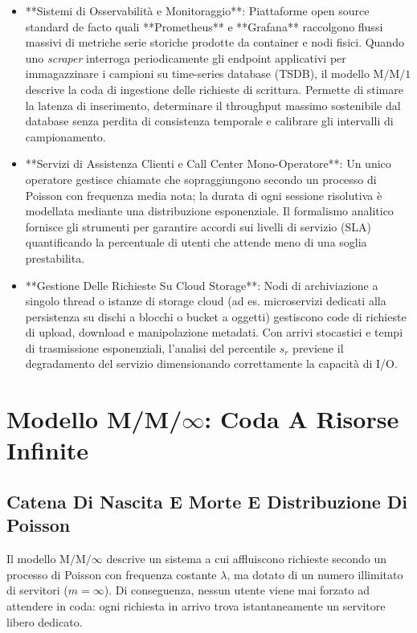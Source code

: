 \documentclass[11pt, a4paper]{article}
\begin{document}
\begin{itemize}
    \item **Sistemi di Osservabilità e Monitoraggio**: Piattaforme open source standard de facto quali **Prometheus** e **Grafana** raccolgono flussi massivi di metriche serie storiche prodotte da container e nodi fisici. Quando uno \emph{scraper} interroga periodicamente gli endpoint applicativi per immagazzinare i campioni su time-series database (TSDB), il modello $\mathrm{M/M/1}$ descrive la coda di ingestione delle richieste di scrittura. Permette di stimare la latenza di inserimento, determinare il throughput massimo sostenibile dal database senza perdita di consistenza temporale e calibrare gli intervalli di campionamento.
    \item **Servizi di Assistenza Clienti e Call Center Mono-Operatore**: Un unico operatore gestisce chiamate che sopraggiungono secondo un processo di Poisson con frequenza media nota; la durata di ogni sessione risolutiva è modellata mediante una distribuzione esponenziale. Il formalismo analitico fornisce gli strumenti per garantire accordi sui livelli di servizio (SLA) quantificando la percentuale di utenti che attende meno di una soglia prestabilita.
    \item **Gestione Delle Richieste Su Cloud Storage**: Nodi di archiviazione a singolo thread o istanze di storage cloud (ad es. microservizi dedicati alla persistenza su dischi a blocchi o bucket a oggetti) gestiscono code di richieste di upload, download e manipolazione metadati. Con arrivi stocastici e tempi di trasmissione esponenziali, l'analisi del percentile $s_r$ previene il degradamento del servizio dimensionando correttamente la capacità di I/O.
\end{itemize}

\newpage


\section{Modello M/M/$\infty$: Coda A Risorse Infinite}

\subsection{Catena Di Nascita E Morte E Distribuzione Di Poisson}

Il modello $\mathrm{M/M/\infty}$ descrive un sistema a cui affluiscono richieste secondo un processo di Poisson con frequenza costante $\lambda$, ma dotato di un numero illimitato di servitori ($m = \infty$). Di conseguenza, nessun utente viene mai forzato ad attendere in coda: ogni richiesta in arrivo trova istantaneamente un servitore libero dedicato.
\end{document}
